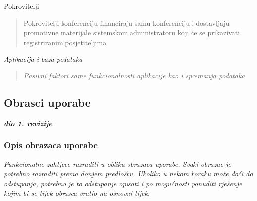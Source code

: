 \begin{packed_enum}
				\item Pokrovitelji
				\begin{quote}
					Pokrovitelji konferenciju financiraju samu konferenciju i dostavljaju promotivne materijale sistemskom administratoru koji će se prikazivati registriranim posjetiteljima
				\end{quote}
				
				
				\item \textit{Aplikacija i baza podataka}
				\begin{quote}
					\textit{Pasivni faktori same funkcionalnosti aplikacije kao i spremanja podataka}
				\end{quote}
			\end{packed_enum}
			
			\eject 
			
			
				
			\subsection{Obrasci uporabe}
				
				\textbf{\textit{dio 1. revizije}}
				
				\subsubsection{Opis obrazaca uporabe}
					\textit{Funkcionalne zahtjeve razraditi u obliku obrazaca uporabe. Svaki obrazac je potrebno razraditi prema donjem predlošku. Ukoliko u nekom koraku može doći do odstupanja, potrebno je to odstupanje opisati i po mogućnosti ponuditi rješenje kojim bi se tijek obrasca vratio na osnovni tijek.}\\
									
